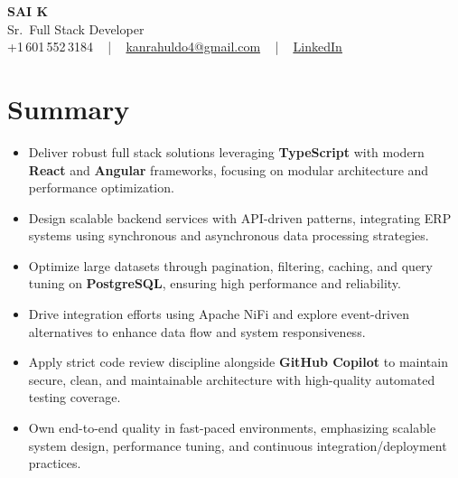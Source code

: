 \documentclass[letterpaper,11pt]{article}
\newcommand{\resumeItem}[1]{
  \item\footnotesize{
    {#1 \vspace{-2pt}}
  }
}
\newcommand{\resumeItemListStart}{\begin{itemize}[leftmargin=*]}
\newcommand{\resumeItemListEnd}{\end{itemize}\vspace{-5pt}}
\begin{document}
\begin{center}
    {\fontsize{14pt}{12pt}\selectfont \textbf{\MakeUppercase{Sai K}}}\\ \vspace{2pt}
    \fontsize{10pt}{12pt}\selectfont Sr.\ Full Stack Developer\\ \vspace{2pt}
    \fontsize{10pt}{12pt}\selectfont +1\,601\,552\,3184 ~ | ~
    \href{mailto:kanrahuldo4@gmail.com}{kanrahuldo4@gmail.com} ~ | ~
    \href{https://www.linkedin.com/in/srrrk/}{\color{blue}\underline{LinkedIn}}
    \vspace{-10pt}
\end{center}

\section{Summary}
\fontsize{9pt}{10pt}\selectfont
\resumeItemListStart
  \resumeItem{Deliver robust full stack solutions leveraging \textbf{TypeScript} with modern \textbf{React} and \textbf{Angular} frameworks, focusing on modular architecture and performance optimization.}
  \resumeItem{Design scalable backend services with API-driven patterns, integrating ERP systems using synchronous and asynchronous data processing strategies.}
  \resumeItem{Optimize large datasets through pagination, filtering, caching, and query tuning on \textbf{PostgreSQL}, ensuring high performance and reliability.}
  \resumeItem{Drive integration efforts using Apache NiFi and explore event-driven alternatives to enhance data flow and system responsiveness.}
  \resumeItem{Apply strict code review discipline alongside \textbf{GitHub Copilot} to maintain secure, clean, and maintainable architecture with high-quality automated testing coverage.}
  \resumeItem{Own end-to-end quality in fast-paced environments, emphasizing scalable system design, performance tuning, and continuous integration/deployment practices.}
\resumeItemListEnd
\vspace{-6pt}

\end{document}
